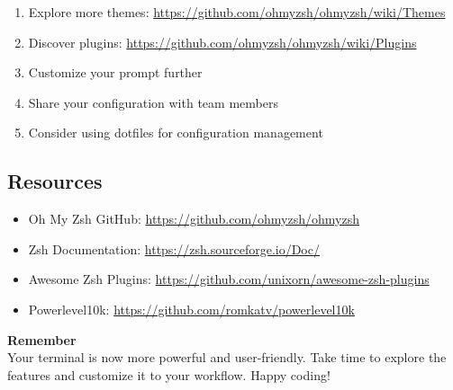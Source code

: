\documentclass{article}
\begin{document}
\begin{enumerate}
    \item Explore more themes: \url{https://github.com/ohmyzsh/ohmyzsh/wiki/Themes}
    \item Discover plugins: \url{https://github.com/ohmyzsh/ohmyzsh/wiki/Plugins}
    \item Customize your prompt further
    \item Share your configuration with team members
    \item Consider using dotfiles for configuration management
\end{enumerate}

\subsection{Resources}

\begin{itemize}
    \item Oh My Zsh GitHub: \url{https://github.com/ohmyzsh/ohmyzsh}
    \item Zsh Documentation: \url{https://zsh.sourceforge.io/Doc/}
    \item Awesome Zsh Plugins: \url{https://github.com/unixorn/awesome-zsh-plugins}
    \item Powerlevel10k: \url{https://github.com/romkatv/powerlevel10k}
\end{itemize}

\begin{infobox}
\textbf{Remember}\\
Your terminal is now more powerful and user-friendly. Take time to explore the features and customize it to your workflow. Happy coding!
\end{infobox}
\end{document}
